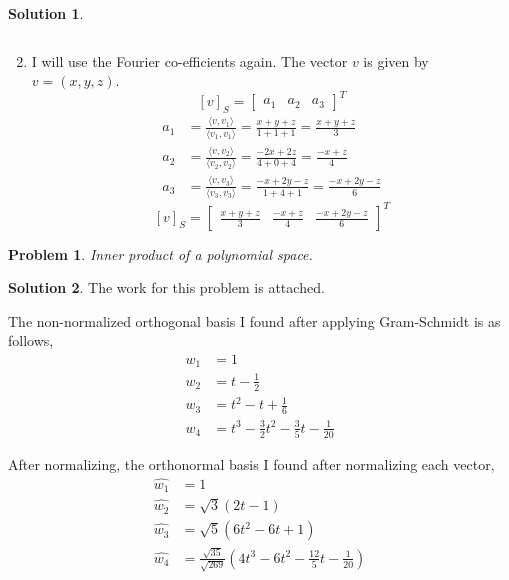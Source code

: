 \documentclass{article}
\newtheorem{problem}{Problem}
\theoremstyle{definition}
\newtheorem*{solution}{Solution}
\theoremstyle{remark}
\begin{document}
\begin{solution}
\begin{enumerate}[\quad(a)]
\[  \]
 \item
  I will use the Fourier co-efficients again.
  The vector $v$ is given by $v=(x,y,z)$.
  \[
  [v]_S=\begin{bmatrix}
  a_1 & a_2 & a_3
  \end{bmatrix}^T
  \]
  \begin{align*}
  a_1 & = \frac{\langle v,v_1 \rangle}{\langle v_1,v_1 \rangle}
   = \frac{x+y+z}{1+1+1}
   = \frac{x+y+z}{3} \\
  a_2 & = \frac{\langle v,v_2 \rangle}{\langle v_2,v_2 \rangle}
   = \frac{-2x+2z}{4+0+4}
   = \frac{-x+z}{4} \\
  a_3 & = \frac{\langle v,v_3 \rangle}{\langle v_3,v_3 \rangle}
   = \frac{-x+2y-z}{1+4+1}
   = \frac{-x+2y-z}{6}
  \end{align*}
  \[\boxed{
  [v]_S=\begin{bmatrix}
  \frac{x+y+z}{3} & \frac{-x+z}{4} & \frac{-x+2y-z}{6}
  \end{bmatrix}^T}
  \]
\end{enumerate}

\end{solution}

\begin{problem}

Inner product of a polynomial space.

\end{problem}

\begin{solution}

The work for this problem is attached.

The non-normalized orthogonal basis I found after applying Gram-Schmidt is as follows,
\begin{align*}
w_1 & = 1 \\
w_2 & = t - \frac{1}{2} \\
w_3 & = t^2 - t + \frac{1}{6} \\
w_4 & = t^3 - \frac{3}{2}t^2 - \frac{3}{5}t - \frac{1}{20}
\end{align*}

After normalizing, the orthonormal basis I found after normalizing each vector,
\begin{align*}
\hat{w_1} & = 1 \\
\hat{w_2} & = \sqrt{3}(2t-1) \\
\hat{w_3} & = \sqrt{5}(6t^2-6t+1) \\
\hat{w_4} & = \frac{\sqrt{35}}{\sqrt{269}}\left(4t^3-6t^2-\frac{12}{5}t-\frac{1}{20}\right)
\end{align*}

\end{solution}
\end{document}
